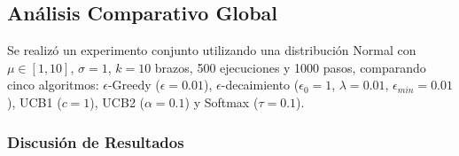 \subsection{Análisis Comparativo Global}

Se realizó un experimento conjunto utilizando una distribución Normal con $\mu \in [1,10]$, $\sigma=1$, $k=10$ brazos, 500 ejecuciones y 1000 pasos, comparando cinco algoritmos: $\epsilon$-Greedy ($\epsilon=0.01$), $\epsilon$-decaimiento ($\epsilon_0=1$, $\lambda=0.01$, $\epsilon_{min}=0.01$), UCB1 ($c=1$), UCB2 ($\alpha=0.1$) y Softmax ($\tau=0.1$).

\subsubsection{Discusión de Resultados}

